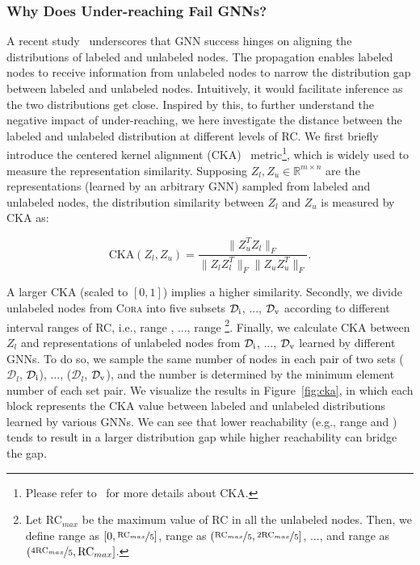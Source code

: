 \documentclass[letterpaper]{article} %
\newcommand{\labeledset}{\mathcal{D}_{l}}
\newcommand{\testset}[1]{$\mathcal{D}_{\text{\uppercase\expandafter{\romannumeral#1}}}$}
\newcommand{\roma}[1]{\uppercase\expandafter{\romannumeral#1}}
\begin{document}
 \subsubsection{Why Does Under-reaching Fail GNNs?} 
 A recent study~\cite{distribution} underscores that GNN success hinges on aligning the distributions of labeled and unlabeled nodes. The propagation enables labeled nodes to receive information from unlabeled nodes to narrow the distribution gap between labeled and unlabeled nodes. Intuitively, it would facilitate inference as the two distributions get close. Inspired by this, to further understand the negative impact of under-reaching, we here investigate the distance between the labeled and unlabeled distribution at different levels of RC. We first briefly introduce the centered kernel alignment (CKA)~\cite{cka} metric\footnote{Please refer to~\cite{cka, distribution} for more details about CKA.}, which is widely used to measure the representation similarity. Supposing $Z_{l}, Z_{u} \in \mathbb{R}^{m \times n}$ are the representations (learned by an arbitrary GNN) sampled from labeled and unlabeled nodes, the distribution similarity between $Z_{l}$ and $Z_{u}$ is measured by CKA as:
 \begin{small}
 	 \begin{equation}
 	\text{CKA}(Z_{l}, Z_{u}) = \frac{\lVert Z_{u}^{T}Z_{l}\rVert_{F}}{\lVert Z_{l}Z_{l}^{T} \rVert_{F} \lVert Z_{u}Z_{u}^{T} \rVert_{F}}.
 \end{equation}
 \end{small}A larger CKA (scaled to $[0,1]$) implies a higher similarity. Secondly, we divide unlabeled nodes from \textsc{Cora} into five subsets \testset{1}, ..., \testset{5} according to different interval ranges of RC, i.e., range \roma{1}, ..., range \roma{5}\footnote{Let RC$_{max}$ be the maximum value of RC in all the unlabeled nodes. Then, we define range \roma{1} as $[0, \nicefrac{\text{RC}_{max}}{5}]$, range \roma{2} as $(\nicefrac{\text{RC}_{max}}{5}, \nicefrac{2\text{RC}_{max}}{5}]$, ..., and range \roma{5} as $(\nicefrac{4\text{RC}_{max}}{5}, \text{RC}_{max}]$.}. Finally, we calculate CKA between $Z_{l}$ and representations of unlabeled nodes from \testset{1}, ..., \testset{5} learned by different GNNs. To do so, we sample the same number of nodes in each pair of two sets ($\labeledset$, \testset{1}), ..., ($\labeledset$, \testset{5}), and the number is determined by the minimum element number of each set pair. We visualize the results in Figure~\ref{fig:cka}, in which each block represents the CKA value between labeled and unlabeled distributions learned by various GNNs. We can see that lower reachability (e.g., range \roma{1} and \roma{2}) tends to result in a larger distribution gap while higher reachability can bridge the gap.
\end{document}
